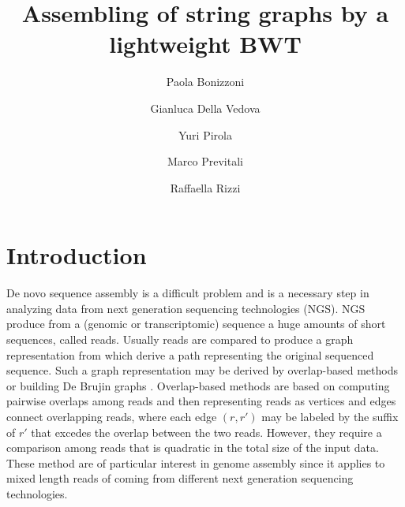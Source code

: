 \documentclass[runningheads,envcountsame,a4paper]{llncs}
\newcommand{\etal}{\textit{et al.}\xspace}
\begin{document}
\title{Assembling of  string graphs by a lightweight BWT}

\author{%
  Paola Bonizzoni \and
  Gianluca Della Vedova \and
  Yuri Pirola \and
  Marco Previtali \and
  Raffaella Rizzi
}
\authorrunning{Bonizzoni \etal}


\maketitle

\begin{abstract}


\end{abstract}

\section{Introduction}
De novo sequence  assembly is a difficult problem  and is a necessary step  in analyzing data from next generation sequencing technologies (NGS).
NGS  produce from a  (genomic  or transcriptomic)  sequence a    huge amounts of short sequences, called reads. Usually reads are  compared to produce a  graph representation from which derive a path  representing the original sequenced sequence. Such a graph representation may be derived by overlap-based methods or building  De Brujin graphs \cite{Zerbino2008, Simpson2009, Peng2010}.
Overlap-based methods are based on computing pairwise overlaps among reads  and then representing reads as vertices and edges connect overlapping reads, where each edge $(r,r')$ may be labeled by the  suffix of $r'$ that  excedes the overlap between the two reads.  However, they require a comparison among reads that is quadratic in the total size of the input data.  These method are of particular interest in genome assembly since it applies to mixed length reads of  coming from different  next generation sequencing technologies.
\end{document}
